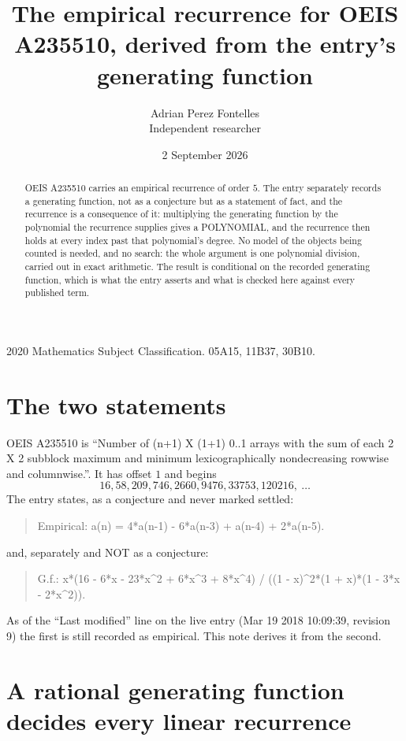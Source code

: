 \documentclass[11pt,a4paper]{article}
\title{The empirical recurrence for OEIS A235510, derived from the entry's generating function}
\author{Adrian Perez Fontelles\\ \small Independent researcher}
\date{2 September 2026}
\theoremstyle{plain}
\theoremstyle{definition}
\begin{document}
\maketitle

\begin{abstract}
OEIS A235510 carries an empirical recurrence of order $5$. The entry separately records a
generating function, not as a conjecture but as a statement of fact, and the recurrence is a
consequence of it: multiplying the generating function by the polynomial the recurrence
supplies gives a POLYNOMIAL, and the recurrence then holds at every index past that
polynomial's degree. No model of the objects being counted is needed, and no search: the
whole argument is one polynomial division, carried out in exact arithmetic. The result is
conditional on the recorded generating function, which is what the entry asserts and what is
checked here against every published term.
\end{abstract}

\noindent\small 2020 Mathematics Subject Classification. 05A15, 11B37, 30B10.\normalsize

\section{The two statements}

OEIS A235510 is ``Number of (n+1) X (1+1) 0..1 arrays with the sum of each 2 X 2 subblock maximum and minimum lexicographically nondecreasing rowwise and columnwise.''. It has offset $1$ and begins
\[
16, 58, 209, 746, 2660, 9476, 33753, 120216,\ \dots
\]
The entry states, as a conjecture and never marked settled:
\begin{quote}
Empirical: a(n) = 4*a(n-1) - 6*a(n-3) + a(n-4) + 2*a(n-5).
\end{quote}
and, separately and NOT as a conjecture:
\begin{quote}
G.f.: x*(16 - 6*x - 23*x\^{}2 + 6*x\^{}3 + 8*x\^{}4) / ((1 - x)\^{}2*(1 + x)*(1 - 3*x - 2*x\^{}2)).
\end{quote}
As of the ``Last modified'' line on the live entry (Mar 19 2018 10:09:39, revision 9) the first is still
recorded as empirical. This note derives it from the second.

\section{A rational generating function decides every linear recurrence}
\end{document}
